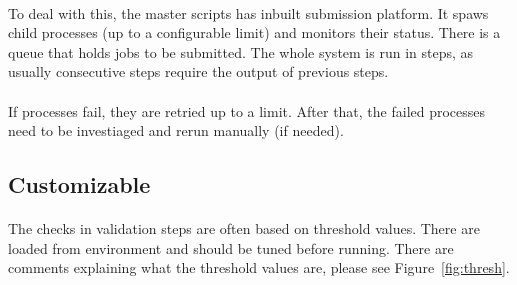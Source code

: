 \documentclass[12pt]{article}
\begin{document}
\paragraph{}
To deal with this, the master scripts has inbuilt submission platform. It spaws child processes (up to a configurable limit) and monitors their status. There is a queue that holds jobs to be submitted. The whole system is run in steps, as usually consecutive steps require the output of previous steps. 

\paragraph{}
If processes fail, they are retried up to a limit. After that, the failed processes need to be investiaged and rerun manually (if needed).

\subsection{Customizable}
\paragraph{}
The checks in validation steps are often based on threshold values. There are loaded from environment and should be tuned before running. There are comments explaining what the threshold values are, please see Figure~\ref{fig:thresh}.
\end{document}
